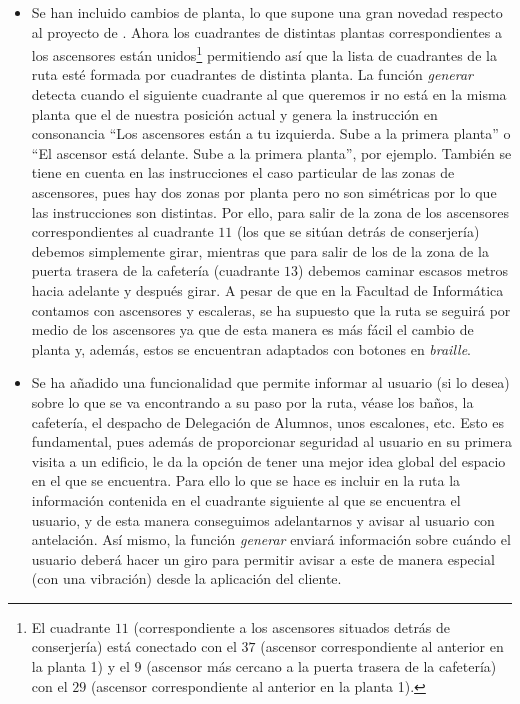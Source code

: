 \begin{itemize}
	
	\item Se han incluido cambios de planta, lo que supone una gran novedad respecto al proyecto de \cite{TFGguia}. Ahora los cuadrantes de distintas plantas correspondientes a los ascensores están unidos\footnote{El cuadrante $11$ (correspondiente a los ascensores situados detrás de conserjería) está conectado con el $37$ (ascensor correspondiente al anterior en la planta 1) y el $9$ (ascensor más cercano a la puerta trasera de la cafetería) con el $29$ (ascensor correspondiente al anterior en la planta 1).} permitiendo así que la lista de cuadrantes de la ruta esté formada por cuadrantes de distinta planta. La función \textit{generar} detecta cuando el siguiente cuadrante al que queremos ir no está en la misma planta que el de nuestra posición actual y genera la instrucción en consonancia ``Los ascensores están a tu izquierda. Sube a la primera planta'' o ``El ascensor está delante. Sube a la primera planta'', por ejemplo. También se tiene en cuenta en las instrucciones el caso particular de las zonas de ascensores, pues hay dos zonas por planta pero no son simétricas por lo que las instrucciones son distintas. Por ello, para salir de la zona de los ascensores correspondientes al cuadrante $11$ (los que se sitúan detrás de conserjería) debemos simplemente girar, mientras que para salir de los de la zona de la puerta trasera de la cafetería (cuadrante $13$) debemos caminar escasos metros hacia adelante y después girar. A pesar de que en la Facultad de Informática contamos con ascensores y escaleras, se ha supuesto que la ruta se seguirá por medio de los ascensores ya que de esta manera es más fácil el cambio de planta y, además, estos se encuentran adaptados con botones en \textit{braille}.
	
	\item Se ha añadido una funcionalidad que permite informar al usuario (si lo desea) sobre lo que se va encontrando a su paso por la ruta, véase los baños, la cafetería, el despacho de Delegación de Alumnos, unos escalones, etc. Esto es fundamental, pues además de proporcionar seguridad al usuario en su primera visita a un edificio, le da la opción de tener una mejor idea global del espacio en el que se encuentra. Para ello lo que se hace es incluir en la ruta la información contenida en el cuadrante siguiente al que se encuentra el usuario, y de esta manera conseguimos adelantarnos y avisar al usuario con antelación. Así mismo, la función \textit{generar} enviará información sobre cuándo el usuario deberá hacer un giro para permitir avisar a este de manera especial (con una vibración) desde la aplicación del cliente.
	
\end{itemize}

